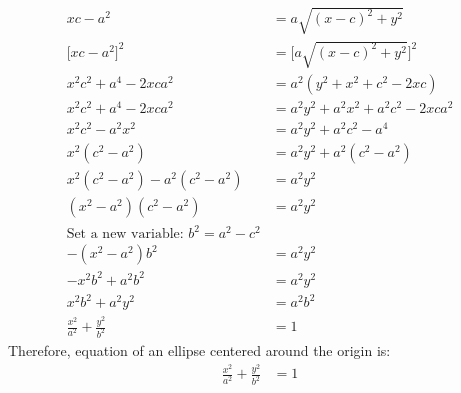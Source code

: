 \documentclass[12pt, a4paper]{article}
\begin{document}
\begin{enumerate}
\begin{align*}
			xc - a^2 &= a\sqrt{(x - c)^2 + y^2}\\
			\Big[xc - a^2\Big]^2 &= \Big[a\sqrt{(x - c)^2 + y^2}\Big]^2\\
			x^2c^2 + a^4 - 2xca^2 &= a^2(y^2 + x^2 + c^2 - 2xc)\\
			x^2c^2 + a^4 - 2xca^2 &= a^2y^2 + a^2x^2 + a^2c^2 - 2xca^2\\
			x^2c^2 - a^2x^2 &= a^2y^2 + a^2c^2 - a^4\\
			x^2(c^2 - a^2) &= a^2y^2 + a^2(c^2 - a^2)\\
			x^2(c^2 - a^2)  - a^2(c^2 - a^2) &= a^2y^2 \\
			(x^2 - a^2)(c^2 - a^2) &=  a^2y^2\\
			\text{Set a new variable: $b^2 = a^2 - c^2$}\\
			-(x^2 - a^2)b^2 &= a^2y^2\\
			-x^2b^2 + a^2b^2 &= a^2y^2\\
			x^2b^2 + a^2y^2 &= a^2b^2\\
			\frac{x^2}{a^2} + \frac{y^2}{b^2} &= 1
		\end{align*}
		Therefore, equation of an ellipse centered around the origin is:
		\begin{align}
			\frac{x^2}{a^2} + \frac{y^2}{b^2} &= 1
		\end{align}
	

\end{enumerate}
\end{document}

